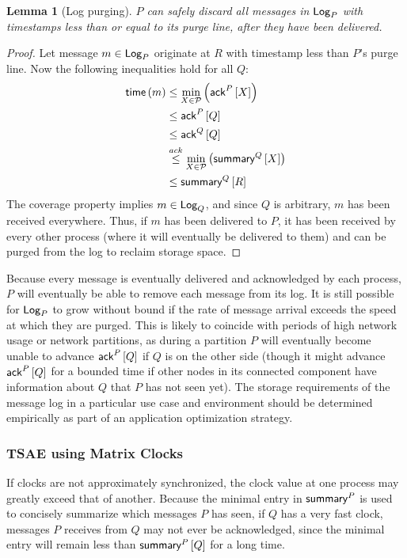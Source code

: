 \documentclass[]             %
{NASA}                       %
\newtheorem{lemma}[theorem]{Lemma}
\theoremstyle{definition}
\begin{document}
\begin{lemma}[Log purging]
  \label{lem:purge}
  $P$ can safely discard all messages in $\textsf{Log}_{P}$ with timestamps less
  than or equal to its purge line, after they have been delivered.
\end{lemma}
\begin{proof}
  Let message $m \in \textsf{Log}_{P}$ originate at $R$ with timestamp less than
  $P$'s purge line. Now the following inequalities hold for all $Q$:
  \begin{align*}
    \mathsf{time}\left(m\right) & \leq \min_{X \in \mathcal{P}}\left(\textsf{ack}^{P}\left[X\right]\right) \\
                  & \leq \textsf{ack}^{P}\left[Q\right] \\
                  & \leq \textsf{ack}^{Q}\left[Q\right] \\
                  & \overset{ack}{\leq} \min_{X \in
                    \mathcal{P}}\left(\textsf{summary}^{Q}\left[X\right]\right)\\
                  & \leq \textsf{summary}^{Q}\left[R\right]
  \end{align*}
  The coverage property implies $m \in \textsf{Log}_{Q}$, and since $Q$ is
  arbitrary, $m$ has been received everywhere. Thus, if $m$ has been
  delivered to $P$, it has been received by every other process (where
  it will eventually be delivered to them) and can be purged from the
  log to reclaim storage space.
\end{proof}




Because every message is eventually delivered and acknowledged by each
process, $P$ will eventually be able to remove each message from its
log. It is still possible for $\textsf{Log}_{P}$ to grow without bound if the
rate of message arrival exceeds the speed at which they are
purged. This is likely to coincide with periods of high network usage
or network partitions, as during a partition $P$ will eventually
become unable to advance $\textsf{ack}^{P}\left[Q\right]$ if $Q$ is on the other side
(though it might advance $\textsf{ack}^{P}\left[Q\right]$ for a bounded time if other
nodes in its connected component have information about $Q$ that $P$
has not seen yet). The storage requirements of the message log in a
particular use case and environment should be determined empirically
as part of an application optimization strategy.

\subsubsection{TSAE using Matrix Clocks}
\label{sssec:tsae-unsynchronized}
If clocks are not approximately synchronized, the clock value at one
process may greatly exceed that of another. Because the minimal entry
in $\textsf{summary}^{P}$ is used to concisely summarize which messages $P$
has seen, if $Q$ has a very fast clock, messages $P$ receives from $Q$
may not ever be acknowledged, since the minimal entry will remain less
than $\textsf{summary}^{P}\left[Q\right]$ for a long time.
\end{document}
